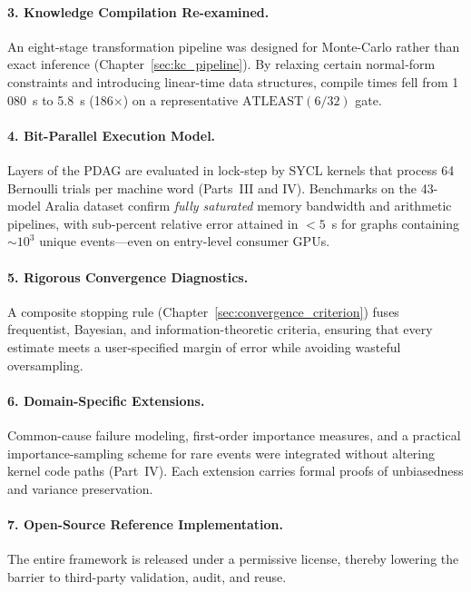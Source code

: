\paragraph*{3. Knowledge Compilation Re-examined.}  An eight-stage transformation
pipeline was designed for Monte-Carlo rather than exact inference
(Chapter~\ref{sec:kc_pipeline}).  By relaxing certain normal‐form constraints
and introducing linear-time data structures, compile times fell from 1\,080~s to
5.8~s (186×) on a representative $\mathrm{ATLEAST}(6/32)$ gate.

\paragraph*{4. Bit-Parallel Execution Model.}  Layers of the PDAG are evaluated
in lock-step by SYCL kernels that process 64 Bernoulli trials per machine word
(Parts~III and IV).  Benchmarks on the 43-model Aralia dataset confirm
\emph{fully saturated} memory bandwidth and arithmetic pipelines, with
sub-percent relative error attained in $<5$~s for graphs containing $\sim\!10^3$
unique events—even on entry-level consumer GPUs.

\paragraph*{5. Rigorous Convergence Diagnostics.}  A composite stopping rule
(Chapter~\ref{sec:convergence_criterion}) fuses frequentist, Bayesian, and
information-theoretic criteria, ensuring that every estimate meets a
user-specified margin of error while avoiding wasteful oversampling.

\paragraph*{6. Domain-Specific Extensions.}  Common-cause failure modeling,
first-order importance measures, and a practical importance-sampling scheme for
rare events were integrated without altering kernel code paths (Part~IV).  Each
extension carries formal proofs of unbiasedness and variance preservation.

\paragraph*{7. Open-Source Reference Implementation.}  The entire framework is
released under a permissive license, thereby lowering the barrier to
third-party validation, audit, and reuse.


